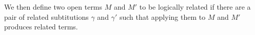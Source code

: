 We then define two open terms $M$ and $M′$ to be logically related
if there are a pair of related subtitutions $γ$ and $γ′$ such that
applying them to $M$ and $M′$ produces related terms.

\begin{code}%
\>[0]\AgdaSpace{}%
\AgdaSymbol{:}\AgdaSpace{}%
\AgdaSpace{}%
\AgdaSpace{}%
\AgdaSpace{}%
\AgdaSpace{}%
\AgdaSpace{}%
\AgdaSpace{}%
\AgdaSpace{}%
\AgdaSpace{}%
\AgdaSpace{}%
\AgdaSpace{}%
\AgdaSpace{}%
\<%
\\
\>[0]%
\>[1386I]\AgdaSpace{}%
\AgdaSpace{}%
\AgdaSpace{}%
\AgdaSpace{}%
\AgdaSpace{}%
\AgdaSpace{}%
\AgdaSpace{}%
\AgdaSymbol{(\AgdaUnderscore{}}\AgdaSpace{}%
\AgdaOperator{\AgdaInductiveConstructor{,}}\AgdaSpace{}%
\AgdaSymbol{\AgdaUnderscore{}}\AgdaSpace{}%
\AgdaOperator{\AgdaInductiveConstructor{,}}\AgdaSpace{}%
\AgdaSymbol{)}\AgdaSpace{}%
\AgdaSymbol{=}\AgdaSpace{}%
\AgdaSpace{}%
\AgdaSymbol{(}\AgdaSpace{}%
\AgdaSpace{}%
\AgdaSymbol{:}\AgdaSpace{}%
\AgdaSymbol{)}\<%
\\
\>[1386I][@{}l@{\AgdaIndent{0}}]%
\>[3]\AgdaSpace{}%
\AgdaSymbol{(}\AgdaSpace{}%
\AgdaSpace{}%
\AgdaSpace{}%
\AgdaSpace{}%
\AgdaSpace{}%
\AgdaSpace{}%
\AgdaSymbol{)}\AgdaSpace{}%
\AgdaSpace{}%
\AgdaSpace{}%
\AgdaSpace{}%
\AgdaSymbol{(}\AgdaSpace{}%
\AgdaSpace{}%
\AgdaSpace{}%
\AgdaSymbol{)}\AgdaSpace{}%
\AgdaSpace{}%
\AgdaSymbol{(}\AgdaSpace{}%
\AgdaSpace{}%
\AgdaSpace{}%
\AgdaSymbol{)}\AgdaSpace{}%
\AgdaSpace{}%
\<%
\end{code}


